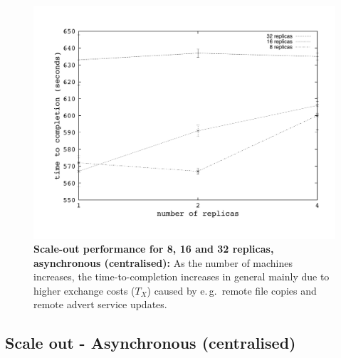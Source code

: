 \documentclass{rspublic}
\newcommand{\jhanote}[1]{ {\textcolor{red} { ***shantenu: #1 }}}
\newcommand{\alnote}[1]{ {\textcolor{blue} { ***andre: #1 }}}
\newcommand{\athotanote}[1]{ {\textcolor{green} { ***athota: #1 }}}
\newcommand{\alnote}[1]{}
\newcommand{\athotanote}[1]{}
\newcommand{\jhanote}[1]{}
\begin{document}
%
\begin{figure}%
\centering
\includegraphics[scale=0.35]{../data/cent_scaleout.pdf}\qquad
\caption{\textbf{Scale-out performance for 8, 16 and 32 replicas, asynchronous (centralised):} 
  As the number of machines increases, the time-to-completion increases in general mainly
  due to higher exchange costs ($T_{X}$) caused by e.\,g.\  remote file copies and remote advert
  service updates.}
\label{fig:scaleout}


\end{figure}

\subsection{Scale out - Asynchronous (centralised)}
\end{document}
